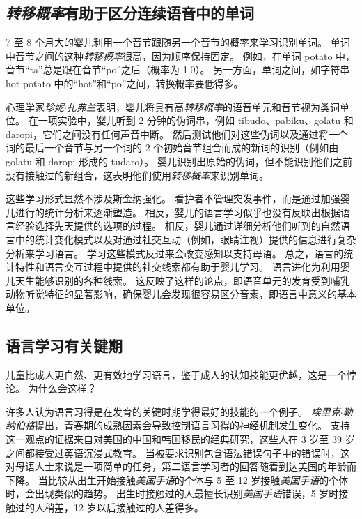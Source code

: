 \subsection{\textit{转移概率}有助于区分连续语音中的单词}

7 至 8 个月大的婴儿利用一个音节跟随另一个音节的概率来学习识别单词。
单词中音节之间的这种\textit{转移概率}很高，因为顺序保持固定。
例如，在单词 potato 中，音节“ta”总是跟在音节“po”之后（概率为 1.0）。
另一方面，单词之间，如字符串 hot potato 中的“hot”和“po”之间，转换概率要低得多。


心理学家\textit{珍妮$\cdot$扎弗兰}表明，婴儿将具有高\textit{转移概率}的语音单元和音节视为类词单位。
在一项实验中，婴儿听到 2 分钟的伪词串，例如 tibudo、pabiku、golatu 和 daropi，它们之间没有任何声音中断。
然后测试他们对这些伪词以及通过将一个词的最后一个音节与另一个词的 2 个初始音节组合而成的新词的识别（例如由 golatu 和 daropi 形成的 tudaro）。
婴儿识别出原始的伪词，但不能识别他们之前没有接触过的新组合，这表明他们使用\textit{转移概率}来识别单词。


这些学习形式显然不涉及斯金纳强化。
看护者不管理突发事件，而是通过加强婴儿进行的统计分析来逐渐塑造。
相反，婴儿的语言学习似乎也没有反映出根据语言经验选择先天提供的选项的过程。
相反，婴儿通过详细分析他们听到的自然语言中的统计变化模式以及对通过社交互动（例如，眼睛注视）提供的信息进行复杂分析来学习语言。
学习这些模式反过来会改变感知以支持母语。
总之，语言的统计特性和语言交互过程中提供的社交线索都有助于婴儿学习。
语言进化为利用婴儿天生能够识别的各种线索。
这反映了这样的论点，即语音单元的发育受到哺乳动物听觉特征的显著影响，确保婴儿会发现很容易区分音素，即语言中意义的基本单位。



\subsection{语言学习有关键期}

儿童比成人更自然、更有效地学习语言，鉴于成人的认知技能更优越，这是一个悖论。
为什么会这样？


许多人认为语言习得是在发育的关键时期学得最好的技能的一个例子。
\textit{埃里克$\cdot$勒纳伯格}提出，青春期的成熟因素会导致控制语言习得的神经机制发生变化。
支持这一观点的证据来自对美国的中国和韩国移民的经典研究，这些人在 3 岁至 39 岁之间都接受过英语沉浸式教育。
当被要求识别包含语法错误句子中的错误时，这对母语人士来说是一项简单的任务，第二语言学习者的回答随着到达美国的年龄而下降。
当比较从出生开始接触\textit{美国手语}的个体与 5 至 12 岁接触\textit{美国手语}的个体时，会出现类似的趋势。
出生时接触过的人最擅长识别\textit{美国手语}错误，5 岁时接触过的人稍差，12 岁以后接触过的人差得多。


